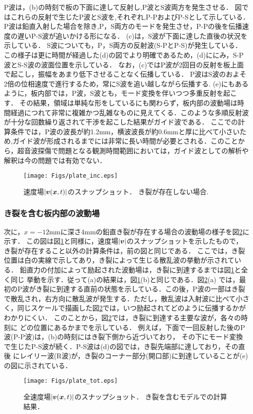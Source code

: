P波は，(b)の時刻で板の下面に達して反射し,P波とS波両方を発生させる．
図ではこれらの反射で生じたP波とS波を,それぞれ,P-PおよびP-Sとして示している．
P波は鉛直入射した場合を除き,P，S両方のモードを発生させ，P-Pの後を伝播速度の遅いP-S波が追いかける形になる．
(c)は，S波が下面に達した直後の状況を示している．
S波についても，P，S両方の反射波(S-PとP-S)が発生している．
この様子は更に時間が経過した(d)の図でより明確であるため，(d)ににみ，S-P波とS-S波の波面位置を示している．
なお，(c)ではP波が2回目の反射を板上面で起こし，振幅をあまり低下させることなく伝播している．
P波はS波のおよそ2倍の位相速度で進行するため，常にS波を追い越しながら伝播する.
(e)にもあるように，板内部では，P波，S波とも，モード変換を伴いつつ多重反射を起こす．
その結果，領域は単純な形をしているにも関わらず，板内部の波動場は時間経過につれて非常に複雑かつ乱雑なものに見えてくる．このような多順反射波が十分な回数繰り返されて干渉を起こした結果がガイド波である．
ここでの計算条件では，P波の波長が約1.2mm，横波波長が約0.6mmと厚に比べて小さいため,ガイド波が形成されるまでには非常に長い時間が必要とされる．このことから，超音波探傷で問題となる観測時間範囲においては，ガイド波としての解析や解釈は今の問題では有効でない．
\begin{figure}[h]
	\begin{center}
	\texttt{[image: Figs/plate\_inc.eps]} 
	\end{center}
	\caption{
		速度場$|\mbox{\boldmath $v$}(\mbox{\boldmath $x$},t)|$のスナップショット．
		き裂が存在しない場合.
	} 
	\label{fig:fig3_1}
\end{figure}
\subsubsection{き裂を含む板内部の波動場}
次に，$x=-12$mmに深さ4mmの鉛直き裂が存在する場合の波動場の様子を図\ref{fig:fig3_2}に示す．
この図は図\ref{fig:fig3_1}と同様に，速度場$|\mbox{\boldmath $v$}|$のスナップショットを示したもので，
き裂が存在すること以外の計算条件は，前の図と同じである．
ここでは，き裂位置は白の実線で示してあり，き裂によって生じる散乱波の挙動が示されている．
鉛直力の付加によって励起された波動場は，き裂に到達するまでは図\ref{fig:fig3_1}と全く同じ
挙動を示す．従って(a)の結果は，図\ref{fig:fig3_1}(b)と同じである．図\ref{fig:fig3_2}(a)
では，最初のP波がき裂に到達する直前の状態を示している．この後，P波の一部はき裂で散乱され，右方向に散乱波が発生する．ただし，散乱波は入射波に比べて小さく，同じスケールで描画した図\ref{fig:fig3_2}では，いつ励起されてどのように伝播するかがわかりにくい．
このことから，図\ref{fig:fig3_2}では，き裂に到達する主要な波が，各々の時刻に
どの位置にあるかまでを示している．
例えば，下面で一回反射した後のP波(P-P波)は，(b)の時刻にはき裂下側から近づいており，
その下にモード変換で生じたP-S波が続く．P-S波は(d)の図では，き裂先端部に達しており，その直後
にレイリー波(R波)が，き裂のコーナー部分(開口部)に到達していることが(e)の図に示されている．
\begin{figure}[h]
	\begin{center}
	\texttt{[image: Figs/plate\_tot.eps]} 
	\end{center}
	\caption{
		全速度場$|\mbox{\boldmath $v$}(\mbox{\boldmath $x$},t)|$のスナップショット．
		き裂を含むモデルでの計算結果．
	} 
	\label{fig:fig3_2}
\end{figure}
